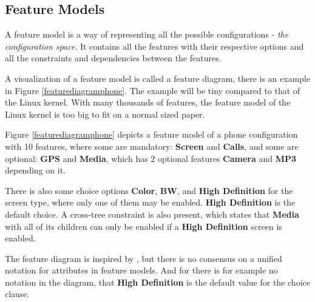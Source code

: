 \documentclass[a4paper,11pt]{report}
\begin{document}
        \subsection{Feature Models}

A feature model is a way of representing all the possible configurations - 
\emph{the configuration space}. It contains all the features with their 
respective options and all the constraints and dependencies between the features.

A visualization of a feature model is called a feature diagram, there is an 
example in Figure \ref{featurediagramphone}. The example will be tiny compared 
to that of the Linux kernel. With many thousands of features, the feature model 
of the Linux kernel is too big to fit on a normal sized paper.

Figure \ref{featurediagramphone} depicts a feature model of a phone 
configuration with 10 features, where some are mandatory: \textbf{Screen} and 
\textbf{Calls}, and some are optional: \textbf{GPS} and \textbf{Media}, which has 2
optional features \textbf{Camera} and \textbf{MP3} depending on it.

There is also some choice options \textbf{Color}, \textbf{BW}, and \textbf{High 
Definition} for the screen type, where only one of them may be enabled. 
\textbf{High Definition} is the default choice. A 
cross-tree constraint is also present, which states that \textbf{Media} with 
all of its children can only be enabled if a \textbf{High Definition} screen is 
enabled.

The feature diagram is inspired by \cite{AAFM}, but there is no consensus on a 
unified notation for attributes in feature models\cite{AAFM}. And for there is 
for example no notation in the diagram, that \textbf{High Definition} is the 
default value for the choice clause.
\end{document}

